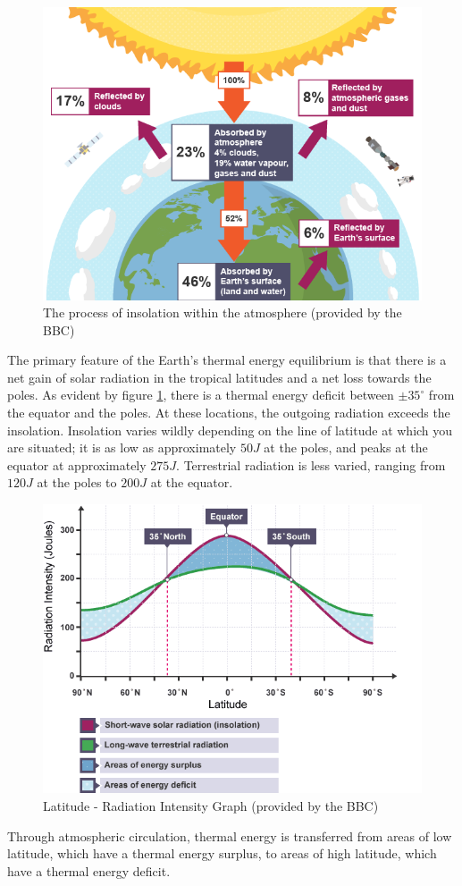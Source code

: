 \begin{figure}[H]
    \centering
    \includegraphics[width=.5\linewidth]{Images/heat_budget.png}
    \caption{The process of insolation within the atmosphere (provided by the BBC)}
\end{figure}

The primary feature of the Earth's thermal energy equilibrium is that there is a net gain of solar radiation in the tropical latitudes and a net loss towards the poles. As evident by figure \ref{energy_balance}, there is a thermal energy deficit between $\pm 35 ^{\circ}$ from the equator and the poles. At these locations, the outgoing radiation exceeds the insolation. Insolation varies wildly depending on the line of latitude at which you are situated; it is as low as approximately $50 J$ at the poles, and peaks at the equator at approximately $275 J$. Terrestrial radiation is less varied, ranging from $120 J$ at the poles to $200 J$ at the equator. 

\begin{figure}[H]
    \centering
    \includegraphics[width=.5\linewidth]{Images/lat_energy_bal.png}
    \caption{Latitude - Radiation Intensity Graph (provided by the BBC)}
    \label{energy_balance}
\end{figure}

Through atmospheric circulation, thermal energy is transferred from areas of low latitude, which have a thermal energy surplus, to areas of high latitude, which have a thermal energy deficit\cite{lat_energy_bal}.

